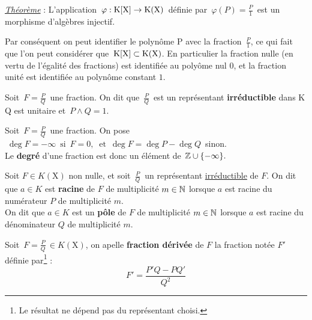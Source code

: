 \noindent\underline{\emph{Théorème}} : L'application \(\,\varphi : \text{K}[\text{X}] \to\text{K}(\text{X})\,\) définie par \(\,\displaystyle \varphi(P)=\frac{P}{1}\,\) est un morphisme d'algèbres injectif.\vspace{0.1cm}\\
\begin{small}Par conséquent on peut identifier le polynôme P avec la fraction $\,\frac{P}{1}$, ce qui fait que l'on peut considérer que \(\,\text{K}[\text{X}]\subset \text{K}(\text{X})\). En particulier la fraction nulle (en vertu de l'égalité des fractions) est identifiée au polyôme nul $0$, et la fraction unité est identifiée au polynôme constant $1$.\end{small}

\vspace{1.6cm}

Soit \(\,\displaystyle F=\frac{P}{Q}\,\) une fraction. On dit que \(\,\displaystyle\frac{P}{Q}\,\) est un représentant \textbf{irréductible} dans K \ssi Q est unitaire et \( \,P\wedge Q=1\).  

\vspace{1.2cm}

Soit \(\,\displaystyle F=\frac{P}{Q}\,\) une fraction. On pose \(\;\deg F=-\infty \, \text{ si } \,F=0,\ \text{ et }\, \deg F= \deg P-\deg Q\,\) sinon.\vspace{0.1cm}\\
Le \textbf{degré} d'une fraction est donc un élément de \(\,\mathbb{Z}\cup \{-\infty\}.\)

\vspace{1.1cm}

Soit \(F\in K(\text{X})\) non nulle, et soit \(\,\displaystyle\frac{P}{Q}\,\) un représentant \underline{irréductible} de $F$. On dit que \(a\in K\) est \textbf{racine} de $F$ de multiplicité $m\in \mathbb{N}$\expo{*} lorsque $a$ est racine du numérateur $P$ de multiplicité $m$.\vspace{0.2cm}\\
On dit que $a\in K$ est un \textbf{pôle} de $F$ de multiplicité $m\in\mathbb{N}$\expo{*} lorsque $a$ est racine du dénominateur $Q$ de multiplicité $m$.

\vspace{1.3cm}

Soit \(\,\displaystyle F=\frac{P}{Q}\,\in K(\text{X})\), on apelle \textbf{fraction dérivée} de $F$ la fraction notée $F'$ définie par\footnote{Le résultat ne dépend pas du représentant choisi.} : \vspace{-0.2cm}
\[F'=\frac{P'Q-PQ'}{Q^2}\]

